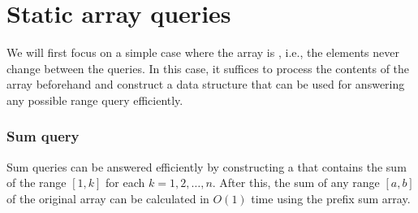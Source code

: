 \section{Static array queries}

We will first focus on a simple case where
the array is , i.e.,
the elements never change between the queries.
In this case, it suffices to process the
contents of the array beforehand and construct
a data structure that can be used for answering
any possible range query efficiently.

\subsubsection{Sum query}


Sum queries can be answered efficiently
by constructing a 
that contains the sum of the range $[1,k]$
for each $k=1,2,\ldots,n$.
After this, the sum of any range $[a,b]$ of the
original array
can be calculated in $O(1)$ time using the
prefix sum array.

